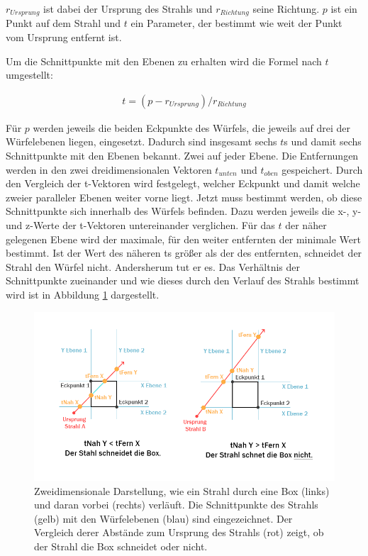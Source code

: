 $r_{Ursprung}$ ist dabei der Ursprung des Strahls und $r_{Richtung}$ seine Richtung. $p$ ist ein Punkt auf dem Strahl und $t$ ein Parameter, der bestimmt wie weit der Punkt vom Ursprung entfernt ist.

Um die Schnittpunkte mit den Ebenen zu erhalten wird die Formel nach $t$ umgestellt:

\begin{align}
t=(p-r_{Ursprung})/r_{Richtung}
\end{align}

Für $p$ werden jeweils die beiden Eckpunkte des Würfels, die jeweils auf drei der Würfelebenen liegen, eingesetzt.
Dadurch sind insgesamt sechs $t$s und damit sechs Schnittpunkte mit den Ebenen bekannt. Zwei auf jeder Ebene. Die Entfernungen werden in den zwei dreidimensionalen Vektoren $t_{unten}$ und $t_{oben}$ gespeichert. Durch den Vergleich der t-Vektoren wird festgelegt, welcher Eckpunkt und damit welche zweier paralleler Ebenen weiter vorne liegt. 
Jetzt muss bestimmt werden, ob diese Schnittpunkte sich innerhalb des Würfels befinden.
Dazu werden jeweils die x-, y- und z-Werte der t-Vektoren untereinander verglichen. Für das $t$ der näher gelegenen Ebene wird der maximale, für den weiter entfernten der minimale Wert bestimmt. Ist der Wert des näheren ts größer als der des entfernten, schneidet der Strahl den Würfel nicht. Andersherum tut er es.
Das Verhältnis der Schnittpunkte zueinander und wie dieses durch den Verlauf des Strahls bestimmt wird ist in Abbildung \ref{img:rayBoxHit} dargestellt.

\begin{figure}
	\centering
	\includegraphics[width=0.9\linewidth]{images/rayBox.png}
	\caption{Zweidimensionale Darstellung, wie ein Strahl durch eine Box (links) und daran vorbei (rechts) verläuft. Die Schnittpunkte des Strahls (gelb) mit den Würfelebenen (blau) sind eingezeichnet. Der Vergleich derer Abstände zum Ursprung des Strahls (rot) zeigt, ob der Strahl die Box schneidet oder nicht.}
	\label{img:rayBoxHit}
\end{figure}

